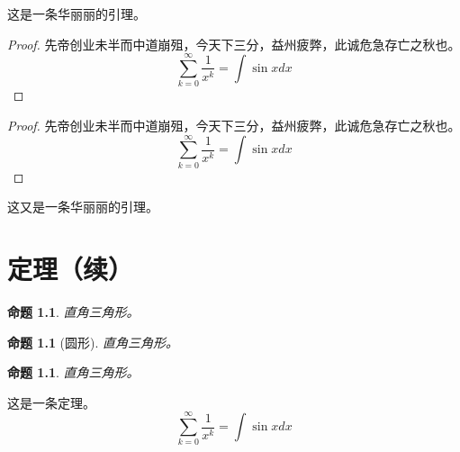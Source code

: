 \documentclass[twoside]{fduthesis}
\begin{document}
\begin{lemma}
  这是一条华丽丽的引理。
\end{lemma}

\begin{proof}
先帝创业未半而中道崩殂，今天下三分，益州疲弊，此诚危急存亡之秋也。
\begin{equation}
  \sum_{k=0}^{\infty} \frac{1}{x^k} = \int \sin x dx
\end{equation}
\end{proof}

\begin{proof}
先帝创业未半而中道崩殂，今天下三分，益州疲弊，此诚危急存亡之秋也。
\begin{equation*}
  \sum_{k=0}^{\infty} \frac{1}{x^k} = \int \sin x dx
\end{equation*}
\end{proof}

\begin{lemma}
  这又是一条华丽丽的引理。
\end{lemma}

\chapter{定理（续）}


\newtheorem{prop}[thm]{命题}

\begin{prop}
  直角三角形。
\end{prop}
\begin{prop}[圆形]
  直角三角形。
\end{prop}
\begin{prop}
  直角三角形。
\end{prop}

\begin{p}
这是一条定理。
\[ \sum_{k=0}^{\infty} \frac{1}{x^k} = \int \sin x dx \]
\end{p}
\end{document}
